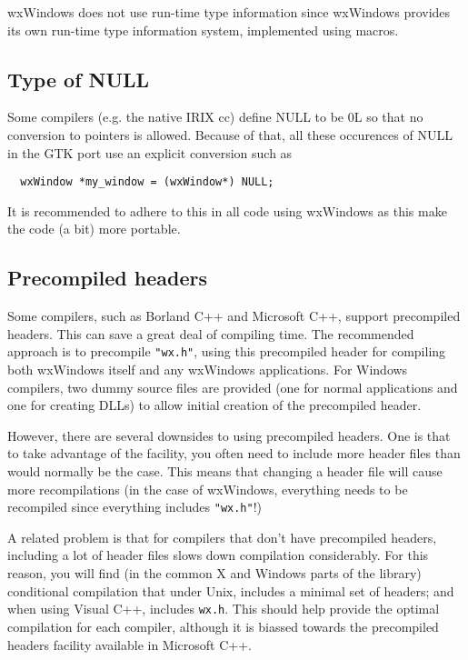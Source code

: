 wxWindows does not use run-time type information since wxWindows provides
its own run-time type information system, implemented using macros.

\subsection{Type of NULL}

Some compilers (e.g. the native IRIX cc) define NULL to be 0L so that
no conversion to pointers is allowed. Because of that, all these
occurences of NULL in the GTK port use an explicit conversion such 
as

{\small
\begin{verbatim}
  wxWindow *my_window = (wxWindow*) NULL;
\end{verbatim}
}

It is recommended to adhere to this in all code using wxWindows as
this make the code (a bit) more portable.

\subsection{Precompiled headers}

Some compilers, such as Borland C++ and Microsoft C++, support
precompiled headers. This can save a great deal of compiling time. The
recommended approach is to precompile {\tt "wx.h"}, using this
precompiled header for compiling both wxWindows itself and any
wxWindows applications. For Windows compilers, two dummy source files
are provided (one for normal applications and one for creating DLLs)
to allow initial creation of the precompiled header.

However, there are several downsides to using precompiled headers. One
is that to take advantage of the facility, you often need to include
more header files than would normally be the case. This means that
changing a header file will cause more recompilations (in the case of
wxWindows, everything needs to be recompiled since everything includes {\tt "wx.h"}!)

A related problem is that for compilers that don't have precompiled
headers, including a lot of header files slows down compilation
considerably. For this reason, you will find (in the common
X and Windows parts of the library) conditional
compilation that under Unix, includes a minimal set of headers;
and when using Visual C++, includes {\tt wx.h}. This should help provide
the optimal compilation for each compiler, although it is
biassed towards the precompiled headers facility available
in Microsoft C++.

